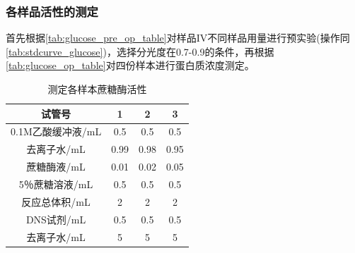 \subsubsection{各样品活性的测定}
首先根据\autoref{tab:glucose_pre_op_table}对样品IV不同样品用量进行预实验(操作同\autoref{tab:stdcurve_glucose})，选择分光度在0.7-0.9的条件，再根据\autoref{tab:glucose_op_table}对四份样本进行蛋白质浓度测定。

\begin{table}[H]
\centering
\caption{测定各样本蔗糖酶活性}
\label{tab:glucose_pre_op_table}
\begin{tabular}{@{}cccc@{}}
\toprule
试管号          & 1    & 2    & 3    \\ \midrule
0.1M乙酸缓冲液/mL & 0.5  & 0.5  & 0.5  \\
去离子水/mL      & 0.99 & 0.98 & 0.95 \\
蔗糖酶液/mL      & 0.01 & 0.02 & 0.05 \\
5％蔗糖溶液/mL    & 0.5  & 0.5  & 0.5  \\
反应总体积/mL     & 2    & 2    & 2    \\
DNS试剂/mL     & 0.5  & 0.5  & 0.5  \\
去离子水/mL      & 5    & 5    & 5    \\ \bottomrule
\end{tabular}
\end{table}

\begin{table}[H]
\centering
\caption{测定各样本蔗糖酶活性}
\label{tab:glucose_op_table}
\end{table}

